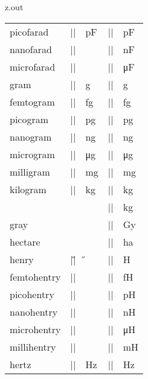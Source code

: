 \begin{VerbatimOut}{z.out}
{\begin{longtable}{@{}lllll@{}}
    \q picofarad&         |\pF|&   \unit{\pF}&   |\pico\farad|&         \unit{\pico\farad}\\
    \q nanofarad&         |\nF|&   \unit{\nF}&   |\nano\farad|&         \unit{\nano\farad}\\
    \q microfarad&        |\uF|&   \unit{\uF}&   |\micro\farad|&        \unit{\micro\farad}\\[6pt]
    gram&                 |\g|&    \unit{\g}&    |\gram|&               \unit{\gram}\\
    \q femtogram&         |\fg|&   \unit{\fg}&   |\femto\gram|&         \unit{\femto\gram}\\
    \q picogram&          |\pg|&   \unit{\pg}&   |\pico\gram|&          \unit{\pico\gram}\\
    \q nanogram&          |\ng|&   \unit{\ng}&   |\nano\gram|&          \unit{\nano\gram}\\
    \q microgram&         |\ug|&   \unit{\ug}&   |\micro\gram|&         \unit{\micro\gram}\\
    \q milligram&         |\mg|&   \unit{\mg}&   |\milli\gram|&         \unit{\milli\gram}\\
    \q kilogram&          |\kg|&   \unit{\kg}&   |\kilogram|&           \unit{\kilogram}\\
    &                     &        &             |\kilo\gram|&          \unit{\kilo\gram}\\[6pt]
    gray&                 &        &             |\gray|&               \unit{\gray}\\[6pt]
    hectare&              &        &             |\hectare|&            \unit{\hectare}\\[6pt]
    henry&                |\H|&    \unit{\H}&    |\henry|&              \unit{\henry}\\
    \q femtohentry&       |\fH|&   \unit{\fH}&   |\femto\henry|&        \unit{\femto\henry}\\
    \q picohentry&        |\pH|&   \unit{\pH}&   |\pico\henry|&         \unit{\pico\henry}\\
    \q nanohentry&        |\nH|&   \unit{\nH}&   |\nano\henry|&         \unit{\nano\henry}\\
    \q microhentry&       |\uH|&   \unit{\uH}&   |\micro\henry|&        \unit{\micro\henry}\\
    \q millihentry&       |\mH|&   \unit{\mH}&   |\milli\henry|&        \unit{\milli\henry}\\[6pt]
    hertz&                |\Hz|&   \unit{\Hz}&   |\hertz|&              \unit{\hertz}\\

\end{longtable}}
\end{VerbatimOut}
